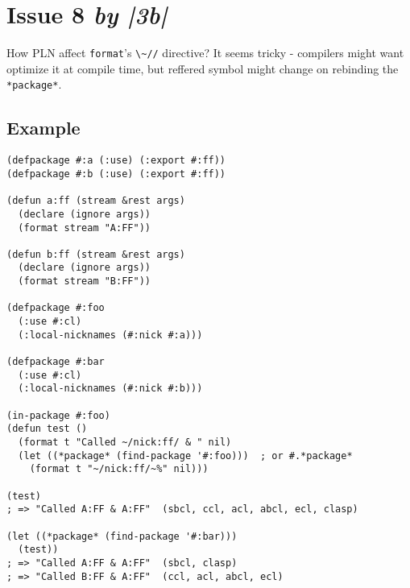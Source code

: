 \documentclass[11pt]{article}
\author{Grolter Bell}
\date{\today}
\title{}
\begin{document}
\section{Issue 8 \emph{by |3b|}}
\label{sec:org2e877ce}
How PLN affect \texttt{format}'s \texttt{\textbackslash{}\textasciitilde{}//} directive? It seems tricky - compilers might
want optimize it at compile time, but reffered symbol might change on
rebinding the \texttt{*package*}.
\subsection{Example}
\label{sec:orge593806}
\begin{verbatim}
(defpackage #:a (:use) (:export #:ff))
(defpackage #:b (:use) (:export #:ff))

(defun a:ff (stream &rest args)
  (declare (ignore args))
  (format stream "A:FF"))

(defun b:ff (stream &rest args)
  (declare (ignore args))
  (format stream "B:FF"))

(defpackage #:foo
  (:use #:cl)
  (:local-nicknames (#:nick #:a)))

(defpackage #:bar
  (:use #:cl)
  (:local-nicknames (#:nick #:b)))

(in-package #:foo)
(defun test ()
  (format t "Called ~/nick:ff/ & " nil)
  (let ((*package* (find-package '#:foo)))  ; or #.*package*
    (format t "~/nick:ff/~%" nil)))

(test)
; => "Called A:FF & A:FF"  (sbcl, ccl, acl, abcl, ecl, clasp)

(let ((*package* (find-package '#:bar)))
  (test))
; => "Called A:FF & A:FF"  (sbcl, clasp)
; => "Called B:FF & A:FF"  (ccl, acl, abcl, ecl)
\end{verbatim}
\end{document}
